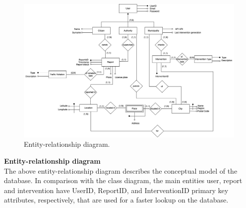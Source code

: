 \begin{figure}[H]
	\centering
	\includegraphics[width=\linewidth]{Images/ER_diagram.png}
	\caption{Entity-relationship diagram.}
\end{figure}
\textbf{Entity-relationship diagram}\\
The above entity-relationship diagram describes the conceptual model of the database. In comparison with the class diagram, the main entities user, report and intervention have UserID, ReportID, and InterventionID primary key attributes, respectively, that are used for a faster lookup on the database.

